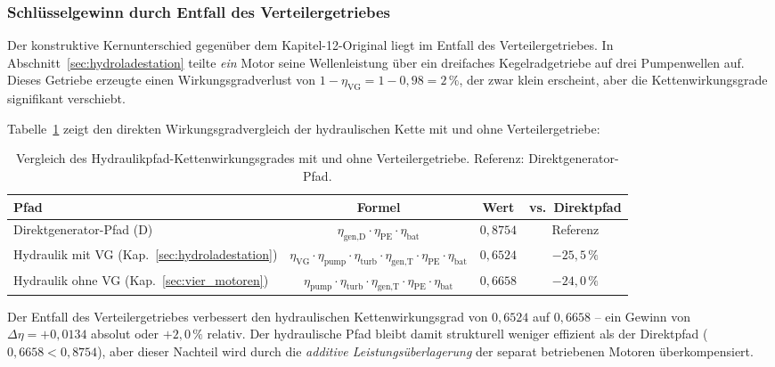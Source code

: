 ﻿\documentclass[a4paper,12pt]{article}
\begin{document}
\subsubsection{Schlüsselgewinn durch Entfall des Verteilergetriebes}

Der konstruktive Kernunterschied gegenüber dem Kapitel-12-Original liegt
im Entfall des Verteilergetriebes. In Abschnitt~\ref{sec:hydroladestation}
teilte \textit{ein} Motor seine Wellenleistung über ein dreifaches
Kegelradgetriebe auf drei Pumpenwellen auf. Dieses Getriebe erzeugte
einen Wirkungsgradverlust von $1 - \eta_\text{VG} = 1 - 0{,}98 = 2\,\%$,
der zwar klein erscheint, aber die Kettenwirkungsgrade signifikant
verschiebt.

Tabelle~\ref{tab:ketten_vergleich_VG} zeigt den direkten
Wirkungsgradvergleich der hydraulischen Kette mit und ohne
Verteilergetriebe:

\begin{table}
  \centering
  \caption{Vergleich des Hydraulikpfad-Kettenwirkungsgrades mit und ohne
           Verteilergetriebe. Referenz: Direktgenerator-Pfad.}
  \label{tab:ketten_vergleich_VG}
  \begin{tabular}{lccc}
    \toprule
    \textbf{Pfad} &
    \textbf{Formel} &
    \textbf{Wert} &
    \textbf{vs.\ Direktpfad} \\
    \midrule
    Direktgenerator-Pfad (D)
      & $\eta_\text{gen,D} \cdot \eta_\text{PE} \cdot \eta_\text{bat}$
      & $0{,}8754$
      & Referenz \\[4pt]
    Hydraulik mit VG (Kap.~\ref{sec:hydroladestation})
      & $\eta_\text{VG} \cdot \eta_\text{pump} \cdot \eta_\text{turb}
         \cdot \eta_\text{gen,T} \cdot \eta_\text{PE} \cdot \eta_\text{bat}$
      & $0{,}6524$
      & $-25{,}5\,\%$ \\[4pt]
    Hydraulik ohne VG (Kap.~\ref{sec:vier_motoren})
      & $\eta_\text{pump} \cdot \eta_\text{turb}
         \cdot \eta_\text{gen,T} \cdot \eta_\text{PE} \cdot \eta_\text{bat}$
      & $0{,}6658$
      & $-24{,}0\,\%$ \\
    \bottomrule
  \end{tabular}
\end{table}

Der Entfall des Verteilergetriebes verbessert den hydraulischen
Kettenwirkungsgrad von $0{,}6524$ auf $0{,}6658$ -- ein Gewinn von
$\Delta\eta = +0{,}0134$ absolut oder $+2{,}0\,\%$ relativ. Der hydraulische
Pfad bleibt damit strukturell weniger effizient als der Direktpfad
($0{,}6658 < 0{,}8754$), aber dieser Nachteil wird durch die \textit{additive
Leistungsüberlagerung} der separat betriebenen Motoren überkompensiert.
\end{document}
